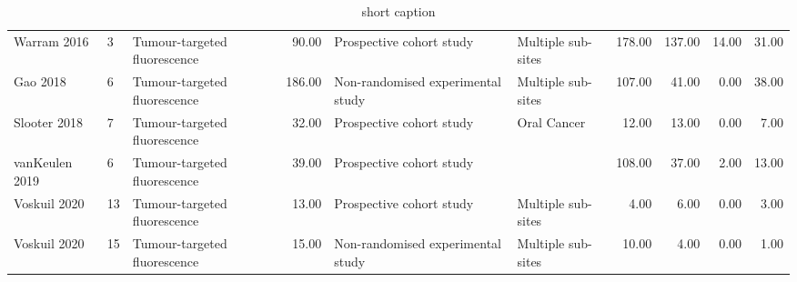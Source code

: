 \begin{table}[ht]
\begin{tabular}{lllrllrrrr}
  Warram 2016 & 3 & Tumour-targeted fluorescence & 90.00 & Prospective cohort study & Multiple sub-sites & 178.00 & 137.00 & 14.00 & 31.00 \\ 
  Gao 2018 & 6 & Tumour-targeted fluorescence & 186.00 & Non-randomised experimental study & Multiple sub-sites & 107.00 & 41.00 & 0.00 & 38.00 \\ 
  Slooter 2018 & 7 & Tumour-targeted fluorescence & 32.00 & Prospective cohort study & Oral Cancer & 12.00 & 13.00 & 0.00 & 7.00 \\ 
  vanKeulen 2019 & 6 & Tumour-targeted fluorescence & 39.00 & Prospective cohort study &  & 108.00 & 37.00 & 2.00 & 13.00 \\ 
  Voskuil 2020 & 13 & Tumour-targeted fluorescence & 13.00 & Prospective cohort study & Multiple sub-sites & 4.00 & 6.00 & 0.00 & 3.00 \\ 
  Voskuil 2020 & 15 & Tumour-targeted fluorescence & 15.00 & Non-randomised experimental study & Multiple sub-sites & 10.00 & 4.00 & 0.00 & 1.00 \\ 
   \hline
\end{tabular}
\endgroup
\caption[Study details, demographics and outcome data]{short caption} 
\label{tab:study_details}
\end{table}
